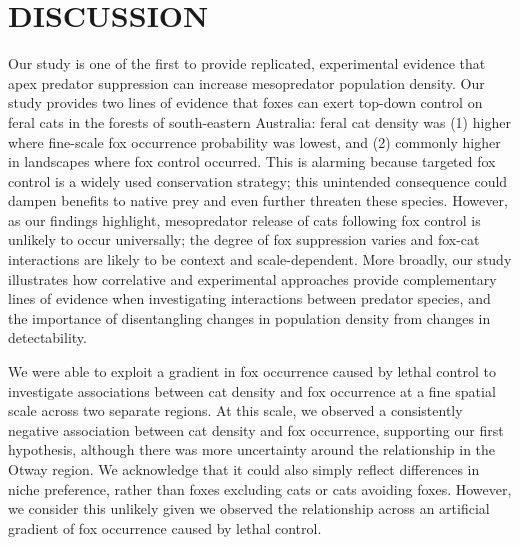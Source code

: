 \documentclass[]{elsarticle} %
\begin{document}
\newpage

\hypertarget{discussion}{%
\section{DISCUSSION}\label{discussion}}

Our study is one of the first to provide replicated, experimental evidence that apex predator suppression can increase mesopredator population density. Our study provides two lines of evidence that foxes can exert top-down control on feral cats in the forests of south-eastern Australia: feral cat density was (1) higher where fine-scale fox occurrence probability was lowest, and (2) commonly higher in landscapes where fox control occurred. This is alarming because targeted fox control is a widely used conservation strategy; this unintended consequence could dampen benefits to native prey and even further threaten these species. However, as our findings highlight, mesopredator release of cats following fox control is unlikely to occur universally; the degree of fox suppression varies and fox-cat interactions are likely to be context and scale-dependent. More broadly, our study illustrates how correlative and experimental approaches provide complementary lines of evidence when investigating interactions between predator species, and the importance of disentangling changes in population density from changes in detectability.

We were able to exploit a gradient in fox occurrence caused by lethal control to investigate associations between cat density and fox occurrence at a fine spatial scale across two separate regions. At this scale, we observed a consistently negative association between cat density and fox occurrence, supporting our first hypothesis, although there was more uncertainty around the relationship in the Otway region. We acknowledge that it could also simply reflect differences in niche preference, rather than foxes excluding cats or cats avoiding foxes. However, we consider this unlikely given we observed the relationship across an artificial gradient of fox occurrence caused by lethal control.
\end{document}
